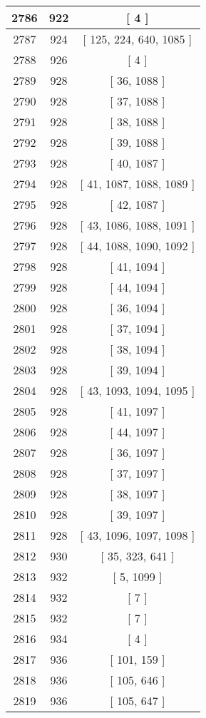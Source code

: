 \begin{center}
\begin{longtable}[H]{|| c c c ||}
\hline
2786 & 922 & [ 4 ] \\ 
\hline
2787 & 924 & [ 125, 224, 640, 1085 ] \\ 
\hline
2788 & 926 & [ 4 ] \\ 
\hline
2789 & 928 & [ 36, 1088 ] \\ 
\hline
2790 & 928 & [ 37, 1088 ] \\ 
\hline
2791 & 928 & [ 38, 1088 ] \\ 
\hline
2792 & 928 & [ 39, 1088 ] \\ 
\hline
2793 & 928 & [ 40, 1087 ] \\ 
\hline
2794 & 928 & [ 41, 1087, 1088, 1089 ] \\ 
\hline
2795 & 928 & [ 42, 1087 ] \\ 
\hline
2796 & 928 & [ 43, 1086, 1088, 1091 ] \\ 
\hline
2797 & 928 & [ 44, 1088, 1090, 1092 ] \\ 
\hline
2798 & 928 & [ 41, 1094 ] \\ 
\hline
2799 & 928 & [ 44, 1094 ] \\ 
\hline
2800 & 928 & [ 36, 1094 ] \\ 
\hline
2801 & 928 & [ 37, 1094 ] \\ 
\hline
2802 & 928 & [ 38, 1094 ] \\ 
\hline
2803 & 928 & [ 39, 1094 ] \\ 
\hline
2804 & 928 & [ 43, 1093, 1094, 1095 ] \\ 
\hline
2805 & 928 & [ 41, 1097 ] \\ 
\hline
2806 & 928 & [ 44, 1097 ] \\ 
\hline
2807 & 928 & [ 36, 1097 ] \\ 
\hline
2808 & 928 & [ 37, 1097 ] \\ 
\hline
2809 & 928 & [ 38, 1097 ] \\ 
\hline
2810 & 928 & [ 39, 1097 ] \\ 
\hline
2811 & 928 & [ 43, 1096, 1097, 1098 ] \\ 
\hline
2812 & 930 & [ 35, 323, 641 ] \\ 
\hline
2813 & 932 & [ 5, 1099 ] \\ 
\hline
2814 & 932 & [ 7 ] \\ 
\hline
2815 & 932 & [ 7 ] \\ 
\hline
2816 & 934 & [ 4 ] \\ 
\hline
2817 & 936 & [ 101, 159 ] \\ 
\hline
2818 & 936 & [ 105, 646 ] \\ 
\hline
2819 & 936 & [ 105, 647 ] \\ 

\end{longtable}
\end{center}
